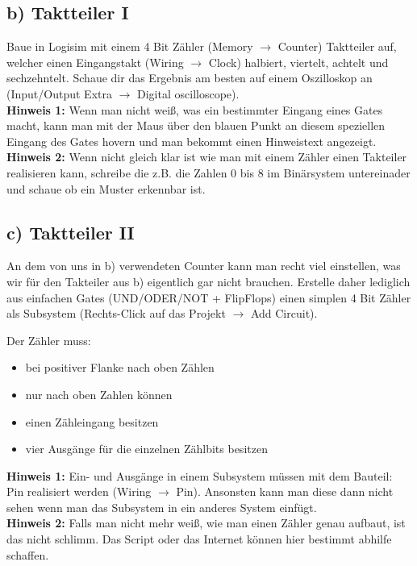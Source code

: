 \documentclass[a4paper]{scrartcl}
\begin{document}
\subsection*{b) Taktteiler I}
Baue in Logisim mit einem 4 Bit Zähler (Memory $\rightarrow$ Counter) Taktteiler auf, welcher einen Eingangstakt (Wiring $\rightarrow$ Clock) halbiert, viertelt, achtelt und sechzehntelt. Schaue dir das Ergebnis am besten auf einem Oszilloskop an (Input/Output Extra $\rightarrow$ Digital oscilloscope).\\

\textbf{Hinweis 1:} Wenn man nicht weiß, was ein bestimmter Eingang eines Gates macht, kann man mit der Maus über den blauen Punkt an diesem speziellen Eingang des Gates hovern und man bekommt einen Hinweistext angezeigt.\\
\textbf{Hinweis 2:} Wenn nicht gleich klar ist wie man mit einem Zähler einen Takteiler realisieren kann, schreibe die z.B. die Zahlen 0 bis 8 im Binärsystem untereinader und schaue ob ein Muster erkennbar ist.\\

\subsection*{c) Taktteiler II}
An dem von uns in b) verwendeten Counter kann man recht viel einstellen, was wir für den Takteiler aus b) eigentlich gar nicht brauchen. Erstelle daher lediglich aus einfachen Gates (UND/ODER/NOT + FlipFlops) einen simplen 4 Bit Zähler als Subsystem (Rechts-Click auf das Projekt $\rightarrow$ Add Circuit).

Der Zähler muss:
\begin{itemize}
	\item bei positiver Flanke nach oben Zählen
	\item nur nach oben Zahlen können
	\item einen Zähleingang besitzen
	\item vier Ausgänge für die einzelnen Zählbits besitzen
\end{itemize}

\textbf{Hinweis 1:} Ein- und Ausgänge in einem Subsystem müssen mit dem Bauteil: Pin realisiert werden (Wiring $\rightarrow$ Pin). Ansonsten kann man diese dann nicht sehen wenn man das Subsystem in ein anderes System einfügt. \\
\textbf{Hinweis 2:} Falls man nicht mehr weiß, wie man einen Zähler genau aufbaut, ist das nicht schlimm. Das Script oder das Internet können hier bestimmt abhilfe schaffen.\\
\end{document}
